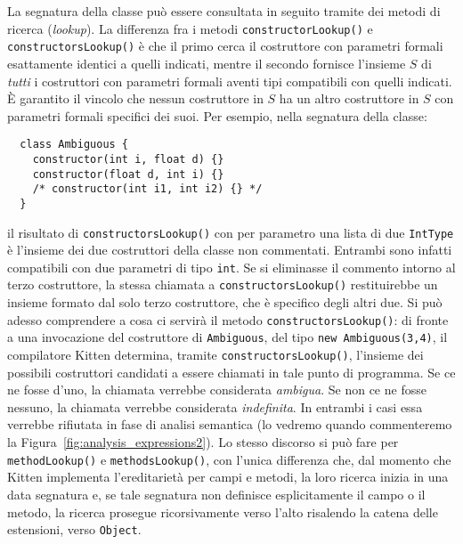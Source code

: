 La segnatura della classe pu\`o essere
consultata in seguito tramite dei metodi di ricerca (\emph{lookup}).
La differenza fra i metodi
\texttt{constructorLookup()} e \texttt{constructorsLookup()} \`e che il
primo cerca il costruttore con parametri formali esattamente identici a quelli
indicati, mentre il secondo fornisce l'insieme $S$ di
\emph{tutti} i costruttori con parametri
formali aventi tipi compatibili con quelli indicati.
\`E garantito il vincolo che
nessun costruttore in $S$ ha un altro costruttore in $S$ con parametri
formali \piu specifici dei suoi. Per esempio, nella segnatura della classe:
%
\begin{verbatim}
  class Ambiguous {
    constructor(int i, float d) {}
    constructor(float d, int i) {}
    /* constructor(int i1, int i2) {} */
  }
\end{verbatim}
%
il risultato di \texttt{constructorsLookup()} con per parametro una lista di
due \texttt{IntType} \`e l'insieme dei
due costruttori della classe non commentati.
Entrambi sono infatti compatibili con
due parametri di tipo \texttt{int}. Se si eliminasse il commento intorno
al terzo costruttore, la stessa chiamata a \texttt{constructorsLookup()}
restituirebbe un insieme formato dal solo
terzo costruttore, che \`e \piu specifico degli altri due.
Si pu\`o adesso comprendere a cosa ci servir\`a il metodo
\texttt{constructorsLookup()}:
di fronte a una invocazione del costruttore di \texttt{Ambiguous},
del tipo \texttt{new Ambiguous(3,4)}, il compilatore Kitten
determina, tramite \texttt{constructorsLookup()}, l'insieme
dei possibili costruttori candidati a essere chiamati in tale punto di
programma. Se ce ne fosse \piu d'uno, la chiamata verrebbe considerata
\emph{ambigua}. Se non ce ne fosse nessuno, la
chiamata verrebbe considerata \emph{indefinita}.
In entrambi i casi essa verrebbe rifiutata in fase di analisi semantica
(lo vedremo quando commenteremo la Figura~\ref{fig:analysis_expressions2}).
Lo stesso discorso si pu\`o fare per
\texttt{methodLookup()} e \texttt{methodsLookup()}, con l'unica differenza che,
dal momento che Kitten implementa l'ereditariet\`a per campi e metodi,
la loro ricerca inizia in una data segnatura e,
se tale segnatura non definisce esplicitamente il campo o il metodo, la ricerca
prosegue ricorsivamente verso l'alto risalendo la catena delle estensioni,
verso \texttt{Object}.

